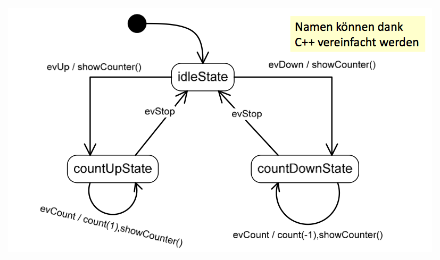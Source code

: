 \begin{figure}[h]
      \centering
      \includegraphics[scale = 0.35]{images/FSM/Up_down_counter_obj}
\end{figure}

